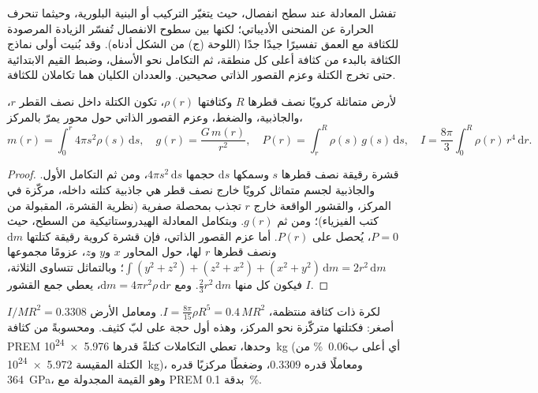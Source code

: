 تفشل المعادلة عند سطح انفصال، حيث يتغيّر التركيب أو البنية البلورية، وحيثما تنحرف الحرارة عن المنحنى الأديباتي؛ لكنها بين سطوح الانفصال تُفسّر الزيادة المرصودة للكثافة مع العمق تفسيرًا جيدًا جدًا (اللوحة (ج) من الشكل أدناه). وقد بُنيت أولى نماذج الكثافة بالبدء من كثافة أعلى كل منطقة، ثم التكامل نحو الأسفل، وضبط القيم الابتدائية حتى تخرج الكتلة وعزم القصور الذاتي صحيحين. والعددان الكليان هما تكاملان للكثافة.

\begin{proposition}
\label{prop:b1:layered-earth:integrals}
لأرض متماثلة كرويًا نصف قطرها $R$ وكثافتها $\rho(r)$، تكون الكتلة داخل نصف القطر $r$، والجاذبية، والضغط، وعزم القصور الذاتي حول محور يمرّ بالمركز،
\[
  m(r) = \int_0^r 4\pi s^2\rho(s)\,\mathrm ds, \quad
  g(r) = \frac{G\,m(r)}{r^2}, \quad
  P(r) = \int_r^R \rho(s)\,g(s)\,\mathrm ds, \quad
  I = \frac{8\pi}{3}\int_0^R \rho(r)\,r^4\,\mathrm dr.
\]
\end{proposition}

\begin{proof}
قشرة رقيقة نصف قطرها $s$ وسمكها $\mathrm ds$ حجمها $4\pi s^2\,\mathrm ds$، ومن ثم التكامل الأول. والجاذبية لجسم متماثل كرويًا خارج نصف قطر هي جاذبية كتلته داخله، مركّزة في المركز، والقشور الواقعة خارج $r$ تجذب بمحصلة صفرية (نظرية القشرة، المقبولة من كتب الفيزياء)؛ ومن ثم $g(r)$. وبتكامل المعادلة الهيدروستاتيكية من السطح، حيث $P = 0$، يُحصل على $P(r)$. أما عزم القصور الذاتي، فإن قشرة كروية رقيقة كتلتها $\mathrm dm$ ونصف قطرها $r$ لها، حول المحاور $x$ و$y$ و$z$، عزومًا مجموعها
$\int (y^2 + z^2) + (z^2 + x^2) + (x^2 + y^2)\,\mathrm dm = 2r^2\,\mathrm dm$؛
وبالتماثل تتساوى الثلاثة، فيكون كل منها $\tfrac23 r^2\,\mathrm dm$. ومع $\mathrm dm = 4\pi r^2\rho\,\mathrm dr$، يعطي جمع القشور $I$.
\end{proof}

لكرة ذات كثافة منتظمة، $I = \tfrac{8\pi}{15}\rho R^5 = 0.4\,MR^2$. ومعامل الأرض $I/MR^2 = 0.3308$ أصغر: فكتلتها متركّزة نحو المركز، وهذه أول حجة على لبّ كثيف. ومحسوبةً من كثافة PREM وحدها، تعطي التكاملات كتلةً قدرها \qty{5.976e24}{kg} (أي أعلى ب\qty{0.06}{\percent} من الكتلة المقيسة \qty{5.972e24}{kg})، ومعاملًا قدره $0.3309$، وضغطًا مركزيًا قدره \qty{364}{GPa}، وهو القيمة المجدولة مع PREM بدقة \qty{0.1}{\percent}.

